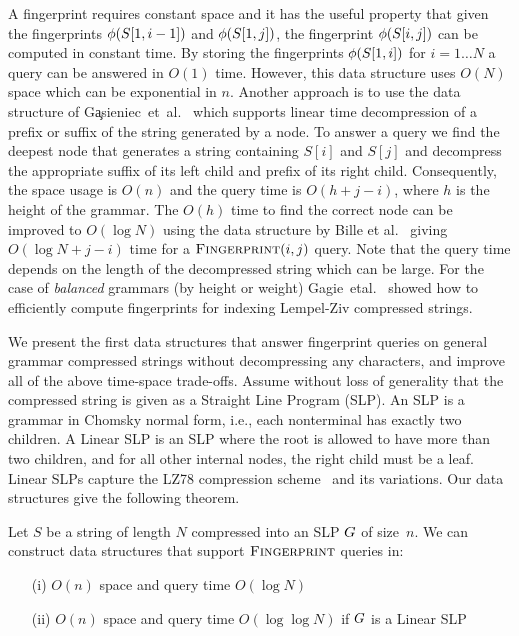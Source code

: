A fingerprint requires constant space and it has the useful property that given the fingerprints $\phi(S[1, i-1])$ and $\phi(S[1, j])$, the fingerprint $\phi(S[i, j])$ can be computed in constant time. By storing the fingerprints $\phi(S[1, i])$ for $i=1\ldots N$ a query can be answered in $O(1)$ time. However, this data structure uses $O(N)$ space which can be exponential in $n$. Another approach is to use the data structure of G\c{a}sieniec~et~al.~\cite{gasieniec2005real} which supports linear time decompression of a prefix or suffix of the string generated by a node. To answer a query we find the deepest node that generates a string containing $S[i]$ and $S[j]$ and decompress the appropriate suffix of its left child and prefix of its right child. Consequently, the space usage is $O(n)$ and the query time is $O(h+j-i)$, where $h$ is the height of the grammar. The $O(h)$ time to find the correct node can be improved to $O(\log N)$ using the data structure by Bille et al.~\cite{bille2011random} giving $O(\log N + j-i)$ time for a $\textsc{Fingerprint}(i, j)$ query. Note that the query time depends on the length of the decompressed string which can be large. For the case of \emph{balanced} grammars (by height or weight) Gagie~etal.~\cite{gagiefingerprint} showed how to efficiently compute fingerprints for indexing Lempel-Ziv compressed strings.

We present the first data structures that answer fingerprint queries on general grammar compressed strings without decompressing any characters, and improve all of the above time-space trade-offs. Assume without loss of generality that the compressed string is given as a Straight Line Program (SLP). An SLP is a grammar in Chomsky normal form, i.e., each nonterminal has exactly two children. A Linear SLP is an SLP where the root is allowed to have more than two children, and for all other internal nodes, the right child must be a leaf. Linear SLPs capture the LZ78 compression scheme~\cite{lz1978} and its variations. Our data structures give the following theorem.

\begin{theorem}\label{thm:fp}
	Let $S$ be a string of length $N$ compressed into an SLP $G$ of size~$n$. We can construct data structures that support $\textsc{Fingerprint}$ queries in:
	\begin{enumerate}
		\item[(i)] $O(n)$ space and query time $O(\log N)$
		\item[(ii)] $O(n)$ space and query time $O(\log \log N)$ if $G$ is a Linear SLP
	\end{enumerate}
\end{theorem}

